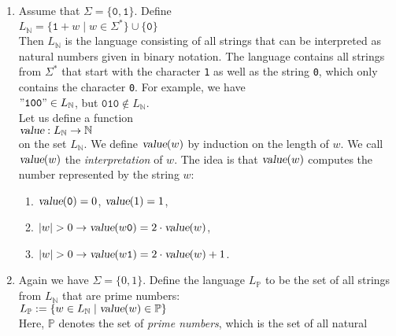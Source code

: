\examplesEng
\begin{enumerate}
\item Assume that $\Sigma = \{\mathtt{0},\mathtt{1}\}$.  Define
      \\[0.2cm]
      \hspace*{1.3cm}
      $L_\mathbb{N} = \{ \mathtt{1}+w \mid w \in \Sigma^* \} \cup \{ \mathtt{0} \}$
      \\[0.2cm]
      Then $L_\mathbb{N}$ is the language consisting of all strings that can be interpreted as
      natural numbers given in binary notation.  The language contains all strings from $\Sigma^*$  that start with 
      the character \texttt{1} as well as the string \texttt{0}, which only contains the character
      \texttt{0}.  For example, we have
      \\[0.2cm]
      \hspace*{1.3cm}
      $\mathtt{\symbol{34}100\symbol{34}} \in L_\mathbb{N}$, \quad but \quad $\mathtt{010} \not\in L_\mathbb{N}$.
      \\[0.2cm]
      Let us define a function 
      \\[0.2cm]
      \hspace*{1.3cm}
      $\textsl{value}: L_\mathbb{N} \rightarrow \mathbb{N}$
      \\[0.2cm]
      on the set $L_\mathbb{N}$.  We define $\textsl{value}(w)$ by induction on the length of $w$.
      We call $\textsl{value}(w)$ the \emph{interpretation} of $w$.  The idea is that
      $\textsl{value}(w)$ computes the number represented by the string $w$:
      \begin{enumerate}
      \item $\textsl{value}(\mathtt{0}) = 0$, $\textsl{value}(1) = 1$,
      \item $|w| > 0 \rightarrow \textsl{value}(w\mathtt{0}) = 2 \cdot \textsl{value}(w)   $,
      \item $|w| > 0 \rightarrow \textsl{value}(w\mathtt{1}) = 2 \cdot \textsl{value}(w) + 1$.
      \end{enumerate}
\item Again we have $\Sigma = \{0,1\}$. Define the language $L_\mathbb{P}$
      to be the set of all strings from $L_\mathbb{N}$ that are prime numbers:
      \\[0.2cm]
      \hspace*{1.3cm}
      $L_\mathbb{P} := \{ w \in L_\mathbb{N} \mid \textsl{value}(w) \in \mathbb{P} \}$
      \\[0.2cm]
      Here, $\mathbb{P}$ denotes the set of \emph{prime numbers}, which is the set of all natural

\end{enumerate}
